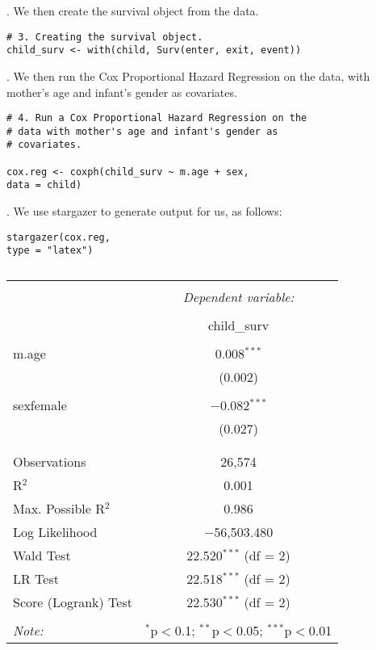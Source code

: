 \documentclass[12pt,letterpaper]{article}
\begin{document}
. We then create the survival object from the data.
\\

\begin{lstlisting}
# 3. Creating the survival object.
child_surv <- with(child, Surv(enter, exit, event))
\end{lstlisting}

. We then run the Cox Proportional Hazard Regression on the data, with mother's age and infant's gender as covariates.
\\
\begin{lstlisting}
# 4. Run a Cox Proportional Hazard Regression on the 
# data with mother's age and infant's gender as
# covariates. 

cox.reg <- coxph(child_surv ~ m.age + sex,
data = child)
\end{lstlisting}

. We use stargazer to generate output for us, as follows:
\\
\begin{lstlisting}
stargazer(cox.reg,
type = "latex")
\end{lstlisting}
\begin{table}[!htbp] \centering 
  \caption{} 
  \label{} 
\begin{tabular}{@{\extracolsep{5pt}}lc} 
\\[-1.8ex]\hline 
\hline \\[-1.8ex] 
 & \multicolumn{1}{c}{\textit{Dependent variable:}} \\ 
\cline{2-2} 
\\[-1.8ex] & child\_surv \\ 
\hline \\[-1.8ex] 
 m.age & 0.008$^{***}$ \\ 
  & (0.002) \\ 
  & \\ 
 sexfemale & $-$0.082$^{***}$ \\ 
  & (0.027) \\ 
  & \\ 
\hline \\[-1.8ex] 
Observations & 26,574 \\ 
R$^{2}$ & 0.001 \\ 
Max. Possible R$^{2}$ & 0.986 \\ 
Log Likelihood & $-$56,503.480 \\ 
Wald Test & 22.520$^{***}$ (df = 2) \\ 
LR Test & 22.518$^{***}$ (df = 2) \\ 
Score (Logrank) Test & 22.530$^{***}$ (df = 2) \\ 
\hline 
\hline \\[-1.8ex] 
\textit{Note:}  & \multicolumn{1}{r}{$^{*}$p$<$0.1; $^{**}$p$<$0.05; $^{***}$p$<$0.01} \\ 
\end{tabular} 
\end{table} 
\end{document}
